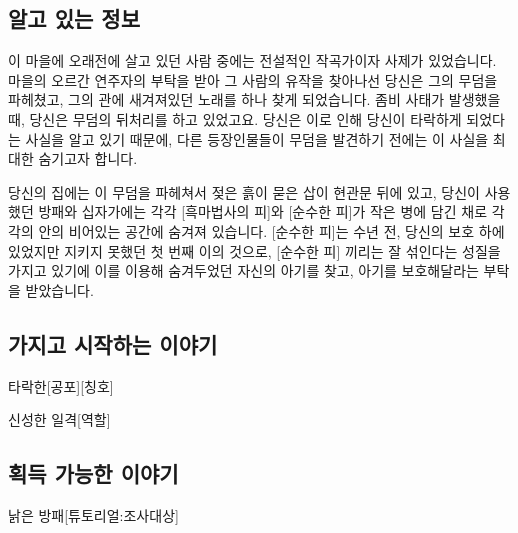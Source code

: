 \documentclass{report}
\begin{document}
	\subsection*{알고 있는 정보}
		이 마을에 오래전에 살고 있던 사람 중에는 전설적인 작곡가이자 사제가 있었습니다. 마을의 오르간 연주자의 부탁을 받아 그 사람의 유작을 찾아나선 당신은 그의 무덤을 파헤쳤고, 그의 관에 새겨져있던 노래를 하나 찾게 되었습니다. 좀비 사태가 발생했을 때, 당신은 무덤의 뒤처리를 하고 있었고요. 당신은 이로 인해 당신이 타락하게 되었다는 사실을 알고 있기 때문에, 다른 등장인물들이 무덤을 발견하기 전에는 이 사실을 최대한 숨기고자 합니다.
		
		당신의 집에는 이 무덤을 파헤쳐서 젖은 흙이 묻은 삽이 현관문 뒤에 있고, 당신이 사용했던 방패와 십자가에는 각각 [흑마법사의 피]와 [순수한 피]가 작은 병에 담긴 채로 각각의 안의 비어있는 공간에 숨겨져 있습니다. [순수한 피]는 수년 전, 당신의 보호 하에 있었지만 지키지 못했던 첫 번째 이의 것으로, [순수한 피] 끼리는 잘 섞인다는 성질을 가지고 있기에 이를 이용해 숨겨두었던 자신의 아기를 찾고, 아기를 보호해달라는 부탁을 받았습니다.
	
	\subsection*{가지고 시작하는 이야기}
		\begin{spoiler}{타락한}{[공포][칭호]}
			
		\end{spoiler}
		
		\begin{spoiler}{신성한 일격}{[역할]}
		\end{spoiler}
	
	\subsection*{획득 가능한 이야기}
		\begin{spoiler}{낡은 방패}{[튜토리얼:조사대상]}
		\end{spoiler}
		
\end{document}
